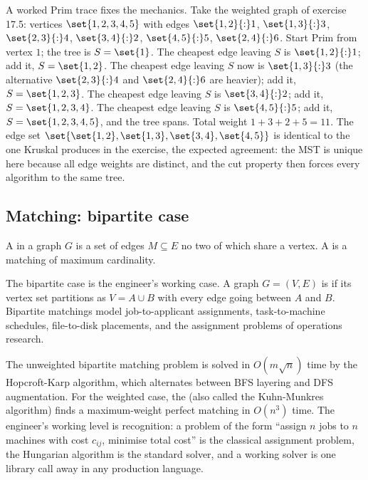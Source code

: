 A worked Prim trace fixes the mechanics. Take the weighted graph of
exercise 17.5: vertices $\set{1, 2, 3, 4, 5}$ with edges $\set{1,2}{:}1$,
$\set{1,3}{:}3$, $\set{2,3}{:}4$, $\set{3,4}{:}2$, $\set{4,5}{:}5$,
$\set{2,4}{:}6$. Start Prim from vertex $1$; the tree is $S =
\set{1}$. The cheapest edge leaving $S$ is $\set{1,2}{:}1$; add it,
$S = \set{1, 2}$. The cheapest edge leaving $S$ now is $\set{1,3}{:}3$
(the alternative $\set{2,3}{:}4$ and $\set{2,4}{:}6$ are heavier);
add it, $S = \set{1, 2, 3}$. The cheapest edge leaving $S$ is
$\set{3,4}{:}2$; add it, $S = \set{1, 2, 3, 4}$. The cheapest edge
leaving $S$ is $\set{4,5}{:}5$; add it, $S = \set{1, 2, 3, 4, 5}$,
and the tree spans. Total weight $1 + 3 + 2 + 5 = 11$. The edge set
$\set{\set{1,2}, \set{1,3}, \set{3,4}, \set{4,5}}$ is identical to
the one Kruskal produces in the exercise, the expected agreement:
the MST is unique here because all edge weights are distinct, and
the cut property then forces every algorithm to the same tree.

\subsection{Matching: bipartite case}

A  in a graph $G$ is a set of edges $M \subseteq
E$ no two of which share a vertex. A  is
a matching of maximum cardinality.

The bipartite case is the engineer's working case. A graph $G = (V,
E)$ is  if its vertex set partitions as $V = A
\cup B$ with every edge going between $A$ and $B$. Bipartite
matchings model job-to-applicant assignments, task-to-machine
schedules, file-to-disk placements, and the assignment problems of
operations research.

The unweighted bipartite matching problem is solved in $O(m
\sqrt{n})$ time by the Hopcroft-Karp algorithm, which alternates
between BFS layering and DFS augmentation. For the weighted case,
the  (also called the
Kuhn-Munkres algorithm) finds a maximum-weight perfect matching in
$O(n^{3})$ time. The engineer's working level is recognition: a
problem of the form ``assign $n$ jobs to $n$ machines with cost
$c_{ij}$, minimise total cost'' is the classical assignment problem,
the Hungarian algorithm is the standard solver, and a working
solver is one library call away in any production language.

